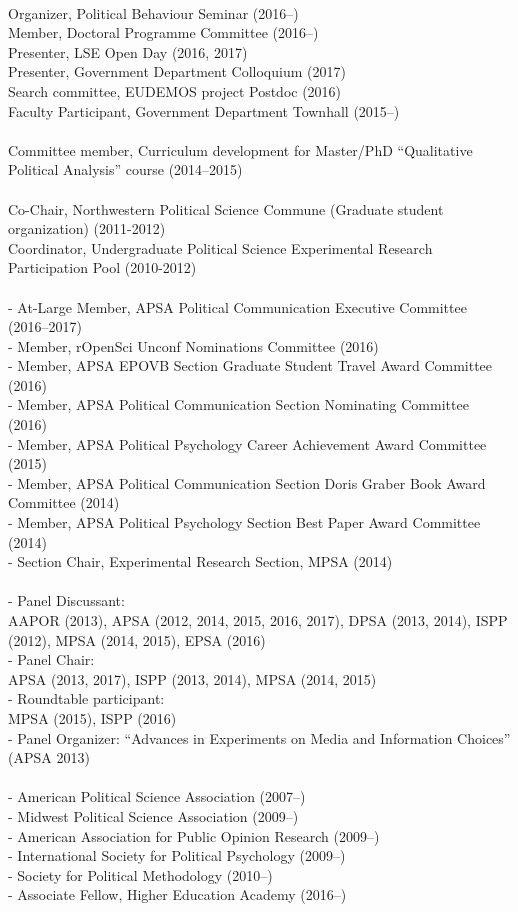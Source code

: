 \documentclass[12pt]{article}
\newcommand{\topic}[1]{\pagebreak[3]\indent {\color{lg}{\footnotesize #1 }}\\}
\newcommand{\entry}[1]{\indent {\color{lg}\guillemotright}\hspace{2pt}#1\vspace{.25em}\\}
\newcommand{\subentry}[1]{{\color{lg}-} #1\vspace{.25em}\\}
\begin{document}
\topic{Departmental (London School of Economics and Political Science)}
	\entry{Organizer, Political Behaviour Seminar (2016--)}
	\entry{Member, Doctoral Programme Committee (2016--)}
	\entry{Presenter, LSE Open Day (2016, 2017)}
	\entry{Presenter, Government Department Colloquium (2017)}
    \entry{Search committee, EUDEMOS project Postdoc (2016)}
	\entry{Faculty Participant, Government Department Townhall (2015--)}

\topic{Departmental (Aarhus University)}
	\entry{Committee member, Curriculum development for Master/PhD ``Qualitative Political Analysis'' course (2014--2015)}

\topic{Departmental (Northwestern University)}
	\entry{Co-Chair, Northwestern Political Science Commune (Graduate student organization) (2011-2012)}
	\entry{Coordinator, Undergraduate Political Science Experimental Research Participation Pool (2010-2012)}

\topic{Disciplinary Committees}
		\subentry{At-Large Member, APSA Political Communication Executive Committee (2016--2017)}
		\subentry{Member, rOpenSci Unconf Nominations Committee (2016)}
		\subentry{Member, APSA EPOVB Section Graduate Student Travel Award Committee (2016)}
		\subentry{Member, APSA Political Communication Section Nominating Committee (2016)}
		\subentry{Member, APSA Political Psychology Career Achievement Award Committee (2015)}
		\subentry{Member, APSA Political Communication Section Doris Graber Book Award Committee (2014)}
		\subentry{Member, APSA Political Psychology Section Best Paper Award Committee (2014)}
		\subentry{Section Chair, Experimental Research Section, MPSA (2014)}

\topic{Service at Professional Conferences}
		\subentry{Panel Discussant:\\ AAPOR (2013), APSA (2012, 2014, 2015, 2016, 2017), DPSA (2013, 2014), ISPP (2012), MPSA (2014, 2015), EPSA (2016)}
		\subentry{Panel Chair:\\ APSA (2013, 2017), ISPP (2013, 2014), MPSA (2014, 2015)}
		\subentry{Roundtable participant:\\ MPSA (2015), ISPP (2016)}
		\subentry{Panel Organizer: ``Advances in Experiments on Media and Information Choices'' (APSA 2013)}

\topic{Professional Memberships:}
		\subentry{American Political Science Association (2007--)}
		\subentry{Midwest Political Science Association (2009--)}
		\subentry{American Association for Public Opinion Research (2009--)}
		\subentry{International Society for Political Psychology (2009--)}
		\subentry{Society for Political Methodology (2010--)}
		\subentry{Associate Fellow, Higher Education Academy (2016--)}
\end{document}
